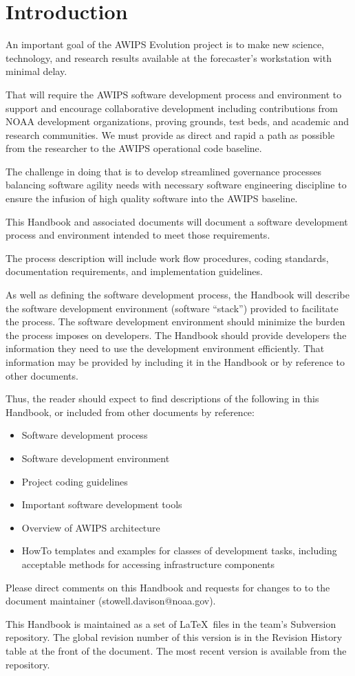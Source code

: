 
\chapter{Introduction}

An important goal of the AWIPS Evolution project is
to make
new science, technology, and research results available at
the forecaster's workstation with minimal delay.

That will require the AWIPS software development
process and environment to support and encourage
collaborative development including contributions from NOAA
development organizations, proving grounds, test beds, 
and academic and research communities.  We must provide as direct
and rapid a
path as possible from the researcher to the AWIPS
operational code baseline.

The
challenge in doing that is to develop streamlined governance processes
balancing software agility needs with necessary software engineering
discipline to ensure the infusion of high quality software 
into the AWIPS baseline.


This Handbook and associated documents will document a 
software development process and environment intended to meet
those requirements.  

The process description will include work flow procedures,
coding standards, documentation requirements, and
implementation guidelines.  

As well as defining the software
development process, the Handbook will describe the software
development environment (software ``stack'') provided to facilitate 
the process.  The software development environment should
minimize the burden the process imposes on developers.  The
Handbook should provide developers the information they need
to use the development environment efficiently.
That information may be provided by including it in the
Handbook or by reference to other documents.

Thus, the reader should expect to find descriptions of the following
in this Handbook, or included from other documents by reference:
\begin{itemize}
\item
Software development process
\item
Software development environment
\item
Project coding guidelines
\item
Important software development tools
\item
Overview of AWIPS architecture
\item
HowTo templates and examples for classes of development
tasks, including acceptable methods for accessing
infrastructure components
\end{itemize}

Please direct 
comments on this Handbook and requests for changes to
to the document maintainer (stowell.davison@noaa.gov).

This Handbook is maintained as a set of \LaTeX\ files in
the team's
Subversion repository.  The global revision
number of this version is in the Revision History
table at the front of the document.
The most recent version is available from the repository.




